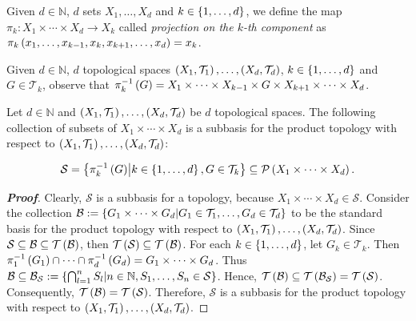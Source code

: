 Given $d\in\mathbb{N}$, $d$ sets $X_1,\dots,X_d$ and $k\in\left\{1,\dots,d\right\}$, we define the map $\pi_k:X_1\times\cdots\times X_d\rightarrow X_k$ called \emph{projection on the $k$-th component} as $\pi_k\left(x_1,\dots,x_{k-1},x_k,x_{k+1},\dots,x_d\right)=x_k$.

\begin{remark}
  Given $d\in\mathbb{N}$, $d$ topological spaces $\left(X_1,\mathcal{T}_1\right),\dots,\left(X_d,\mathcal{T}_d\right)$, $k\in\left\{1,\dots,d\right\}$ and $G\in\mathcal{T}_k$, observe that $\pi_k^{-1}\left(G\right)=X_1\times\cdots\times X_{k-1}\times G\times X_{k+1}\times\cdots\times X_d$.
\end{remark}

\begin{proposition}\label{Finite product topology subbasis}
  Let $d\in\mathbb{N}$ and $\left(X_1,\mathcal{T}_1\right),\dots,\left(X_d,\mathcal{T}_d\right)$ be $d$ topological spaces. The following collection of subsets of $X_1\times\cdots\times X_d$ is a subbasis for the product topology with respect to $\left(X_1,\mathcal{T}_1\right),\dots,\left(X_d,\mathcal{T}_d\right)$:

  \begin{equation}
      \mathcal{S}=\left\{\pi^{-1}_k\left(G\right)\middle|k\in\left\{1,\dots,d\right\},G\in\mathcal{T}_k\right\}\subseteq\mathcal{P}\left(X_1\times\cdots\times X_d\right).
  \end{equation}
  \begin{proof}[\rm\textbf{Proof}]
    Clearly, $\mathcal{S}$ is a subbasis for a topology, because $X_1\times\cdots\times X_d\in\mathcal{S}$. Consider the collection $\mathcal{B}:=\left\{G_1\times\cdots\times G_d\middle|G_1\in\mathcal{T}_1,\dots,G_d\in\mathcal{T}_d\right\}$ to be the standard basis for the product topology with respect to $\left(X_1,\mathcal{T}_1\right),\dots,\left(X_d,\mathcal{T}_d\right)$. Since $\mathcal{S}\subseteq\mathcal{B}\subseteq\mathcal{T}\left(\mathcal{B}\right)$, then $\mathcal{T}\left(\mathcal{S}\right)\subseteq\mathcal{T}\left(\mathcal{B}\right)$. For each $k\in\left\{1,\dots,d\right\}$, let $G_k\in\mathcal{T}_k$. Then $\pi_1^{-1}\left(G_1\right)\cap\dots\cap\pi_d^{-1}\left(G_d\right)=G_1\times\cdots\times G_d$. Thus $\mathcal{B}\subseteq\mathcal{B}_{\mathcal{S}}:=\left\{\bigcap_{l=1}^{n}{S_l}\middle|n\in\mathbb{N},S_1,\dots,S_n\in\mathcal{S}\right\}$. Hence, $\mathcal{T}\left(\mathcal{B}\right)\subseteq\mathcal{T}\left(\mathcal{B}_\mathcal{S}\right)=\mathcal{T}\left(\mathcal{S}\right)$. Consequently, $\mathcal{T}\left(\mathcal{B}\right)=\mathcal{T}\left(\mathcal{S}\right)$. Therefore, $\mathcal{S}$ is a subbasis for the product topology with respect to $\left(X_1,\mathcal{T}_1\right),\dots,\left(X_d,\mathcal{T}_d\right)$.
  \end{proof}
\end{proposition}

